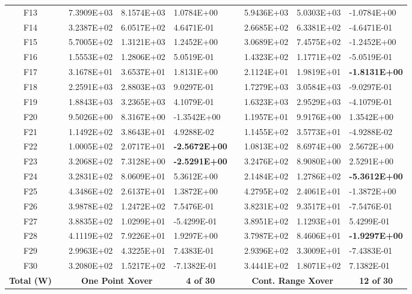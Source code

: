 \documentclass[graybox]{svmult}
\begin{document}
\begin{table}[]
\begin{tabular}{@{}cllllllll@{}}
    F13 &  & 7.3909E+03 & 8.1574E+03 & 1.0784E+00 &  & 5.9436E+03 & 5.0303E+03 & -1.0784E+00 \\
    F14 &  & 3.2387E+02 & 6.0517E+02 & 4.6471E-01 &  & 2.6685E+02 & 6.3381E+02 & -4.6471E-01 \\
    F15 &  & 5.7005E+02 & 1.3121E+03 & 1.2452E+00 &  & 3.0689E+02 & 7.4575E+02 & -1.2452E+00 \\
    F16 &  & 1.5553E+02 & 1.2806E+02 & 5.0519E-01 &  & 1.4323E+02 & 1.1771E+02 & -5.0519E-01 \\
    F17 &  & 3.1678E+01 & 3.6537E+01 & 1.8131E+00 &  & 2.1124E+01 & 1.9819E+01 & \textbf{-1.8131E+00} \\
    F18 &  & 2.2591E+03 & 2.8803E+03 & 9.0297E-01 &  & 1.7279E+03 & 3.0584E+03 & -9.0297E-01 \\
    F19 &  & 1.8843E+03 & 3.2365E+03 & 4.1079E-01 &  & 1.6323E+03 & 2.9529E+03 & -4.1079E-01 \\
    F20 &  & 9.5026E+00 & 8.3167E+00 & -1.3542E+00 &  & 1.1957E+01 & 9.9176E+00 & 1.3542E+00 \\
    F21 &  & 1.1492E+02 & 3.8643E+01 & 4.9288E-02 &  & 1.1455E+02 & 3.5773E+01 & -4.9288E-02 \\
    F22 &  & 1.0005E+02 & 2.0717E+01 & \textbf{-2.5672E+00} &  & 1.0813E+02 & 8.6974E+00 & 2.5672E+00 \\
    F23 &  & 3.2068E+02 & 7.3128E+00 & \textbf{-2.5291E+00} &  & 3.2476E+02 & 8.9080E+00 & 2.5291E+00 \\
    F24 &  & 3.2831E+02 & 8.0609E+01 & 5.3612E+00 &  & 2.1484E+02 & 1.2786E+02 & \textbf{-5.3612E+00} \\
    F25 &  & 4.3486E+02 & 2.6137E+01 & 1.3872E+00 &  & 4.2795E+02 & 2.4061E+01 & -1.3872E+00 \\
    F26 &  & 3.9878E+02 & 1.2472E+02 & 7.5476E-01 &  & 3.8231E+02 & 9.3517E+01 & -7.5476E-01 \\
    F27 &  & 3.8835E+02 & 1.0299E+01 & -5.4299E-01 &  & 3.8951E+02 & 1.1293E+01 & 5.4299E-01 \\
    F28 &  & 4.1119E+02 & 7.9226E+01 & 1.9297E+00 &  & 3.7987E+02 & 8.4606E+01 & \textbf{-1.9297E+00} \\
    F29 &  & 2.9963E+02 & 4.3225E+01 & 7.4383E-01 &  & 2.9396E+02 & 3.3009E+01 & -7.4383E-01 \\
    F30 &  & 3.2080E+02 & 1.5217E+02 & -7.1382E-01 &  & 3.4441E+02 & 1.8071E+02 & 7.1382E-01 \\
    \textbf{Total   (W)} & \multicolumn{1}{c}{\textbf{}} & \multicolumn{2}{c}{\textbf{One Point   Xover}} & \multicolumn{1}{c}{\textbf{4 of 30}} & \multicolumn{1}{c}{\textbf{}} & \multicolumn{2}{c}{\textbf{Cont. Range   Xover}} & \multicolumn{1}{c}{\textbf{12 of 30}} \\ \bottomrule
    \end{tabular}
    \end{table}
\end{document}
